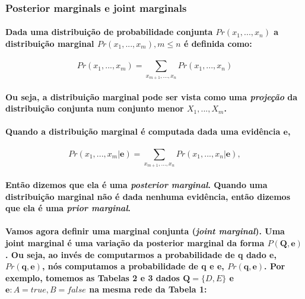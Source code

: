 \documentclass[a4paper,10pt]{article}
\theoremstyle{plain}
\begin{document}
\subsubsection{Posterior marginals e joint marginals}

\paragraph{
  Dada uma distribuição de probabilidade conjunta\cite{project-def} $Pr(x_1,...,x_n)$ a 
  distribuição marginal $Pr(x_1,...,x_m), m \leq n$ é definida como:
}

\begin{equation}
  Pr(x_1,...,x_m) = \sum_{x_{m+1},...,x_n} Pr(x_1,...,x_n)
\end{equation}

\paragraph{
  Ou seja, a distribuição marginal pode ser vista como uma \textit{projeção} da distribuição
  conjunta num conjunto menor $X_1,...,X_m$.
}

\paragraph{
  Quando a distribuição marginal é computada dada uma evidência $\textbf{e}$,
}
 
\begin{equation}
  Pr(x_1,...,x_m|\textbf{e}) = \sum_{x_{m+1},...,x_n} Pr(x_1,...,x_n|\textbf{e}),
\end{equation}

\paragraph{
  Então dizemos que ela é uma \textit{posterior marginal}. Quando uma distribuição marginal não é
  dada nenhuma evidência, então dizemos que ela é uma \textit{prior marginal}.
}

\paragraph{
  Vamos agora definir uma marginal conjunta (\textit{joint marginal}). Uma joint marginal é uma
  variação da posterior marginal da forma $P(\textbf{Q}, \textbf{e})$. Ou seja, ao invés de 
  computarmos a probabilidade de \textbf{q} dado \textbf{e}, $Pr(\textbf{q}, \textbf{e})$, nós
  computamos a probabilidade de \textbf{q} e \textbf{e}, $Pr(\textbf{q}, \textbf{e})$. Por exemplo,
  tomemos as Tabelas 2 e 3 dados $\textbf{Q} = \{D, E\}$ e $\textbf{e}: A = true, B = false$ na
  mesma rede da Tabela 1:
}
\end{document}

